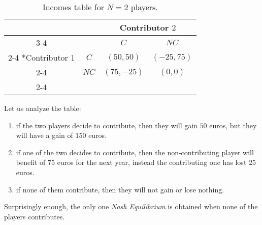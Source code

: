 \documentclass{article}
\begin{document}
\begin{table}[h!]
    \centering
    \setlength{\extrarowheight}{2pt}
    \begin{tabular}{*{4}{c|}}
      \multicolumn{2}{c}{} & \multicolumn{2}{c}{Contributor $2$}\\\cline{3-4}
      \multicolumn{1}{c}{} &  & $C$  & $NC$ \\\cline{2-4}
      \multirow{2}*{Contributor $1$}  & $C$ & $(50,50)$ & $(-25, 75)$ \\\cline{2-4}
      & $NC$ & $(75, -25)$ & $(0,0)$ \\\cline{2-4}
    \end{tabular}
    \caption{Incomes table for $N=2$ players.}
\end{table}

\noindent Let us analyze the table:
\begin{enumerate}
    \item if the two players decide to contribute, then they will gain $50$ euros, but they will have a gain of $150$ euros.
    \item if one of the two decides to contribute, then the non-contributing player will benefit of $75$ euros for the next year, instead the contributing one has lost $25$ euros.
    \item if none of them contribute, then they will not gain or lose nothing.
\end{enumerate}

\noindent Surprisingly enough, the only one \textit{Nash Equilibrium} is obtained when none of the players contributes.
\end{document}
